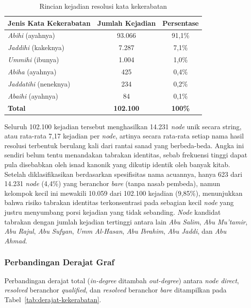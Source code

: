 \begin{table}[H]
\centering
\caption{Rincian kejadian resolusi kata kekerabatan}
\label{tab:absorpsi-kekerabatan}
\renewcommand{\arraystretch}{1.3}
\begin{tabular}{|l|c|c|}
\hline
\textbf{Jenis Kata Kekerabatan} & \textbf{Jumlah Kejadian} & \textbf{Persentase} \\
\hline
\textit{Abihi} (ayahnya) & 93.066 & 91,1\% \\
\hline
\textit{Jaddihi} (kakeknya) & 7.287 & 7,1\% \\
\hline
\textit{Ummihi} (ibunya) & 1.004 & 1,0\% \\
\hline
\textit{Abiha} (ayahnya) & 425 & 0,4\% \\
\hline
\textit{Jaddatihi} (neneknya) & 234 & 0,2\% \\
\hline
\textit{Abaihi} (ayahnya) & 84 & 0,1\% \\
\hline
\textbf{Total} & \textbf{102.100} & \textbf{100\%} \\
\hline
\end{tabular}
\end{table}

Seluruh 102.100 kejadian tersebut menghasilkan 14.231 \textit{node} unik secara string, atau rata-rata 7,17 kejadian per \textit{node}, artinya secara rata-rata setiap nama hasil resolusi terbentuk berulang kali dari rantai sanad yang berbeda-beda. Angka ini sendiri belum tentu menandakan tabrakan identitas, sebab frekuensi tinggi dapat pula disebabkan oleh isnad kanonik yang dikutip identik oleh banyak kitab. Setelah diklasifikasikan berdasarkan spesifisitas nama acuannya, hanya 623 dari 14.231 \textit{node} (4,4\%) yang beranchor \textit{bare} (tanpa nasab pembeda), namun kelompok kecil ini mewakili 10.059 dari 102.100 kejadian (9,85\%), menunjukkan bahwa risiko tabrakan identitas terkonsentrasi pada sebagian kecil \textit{node} yang justru menyumbang porsi kejadian yang tidak sebanding. \textit{Node} kandidat tabrakan dengan jumlah kejadian tertinggi antara lain \textit{Abu Salim}, \textit{Abu Mu'tamir}, \textit{Abu Rajul}, \textit{Abu Sufyan}, \textit{Umm Al-Hasan}, \textit{Abu Ibrahim}, \textit{Abu Jaddi}, dan \textit{Abu Ahmad}.

\subsubsection{Perbandingan Derajat Graf}
Perbandingan derajat total (\textit{in-degree} ditambah \textit{out-degree}) antara \textit{node direct}, \textit{resolved} beranchor \textit{qualified}, dan \textit{resolved} beranchor \textit{bare} ditampilkan pada Tabel~\ref{tab:derajat-kekerabatan}.

